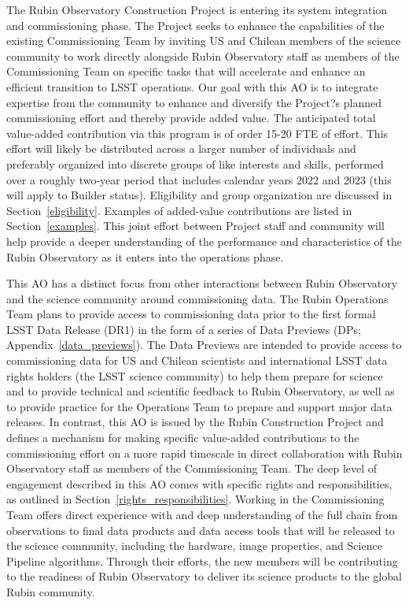 \documentclass[SE,authoryear,toc]{lsstdoc}
\begin{document}
The Rubin Observatory Construction Project is entering its system integration and commissioning phase. The Project seeks to enhance the capabilities of the existing Commissioning Team by inviting US and Chilean members of the science community to work directly alongside Rubin Observatory staff as members of the Commissioning Team on specific tasks that will accelerate and enhance an efficient transition to LSST operations. Our goal with this AO is to integrate expertise from the community to enhance and diversify the Project?s planned commissioning effort and thereby provide added value. The anticipated total value-added contribution via this program is of order 15-20 FTE of effort. This effort will likely be distributed across a larger number of individuals and preferably organized into discrete groups of like interests and skills, performed over a roughly two-year period that includes calendar years 2022 and 2023 (this will apply to Builder status). Eligibility and group organization are discussed in Section~\ref{eligibility}. Examples of added-value contributions are listed in Section~\ref{examples}. This joint effort between Project staff and community will help provide a deeper understanding of the performance and characteristics of the Rubin Observatory as it enters into the operations phase.

This AO has a distinct focus from other interactions between Rubin Observatory and the science community around commissioning data. The Rubin Operations Team plans to provide access to commissioning data prior to the first formal LSST Data Release (DR1) in the form of a series of Data Previews (DPs; Appendix~\ref{data_previews}). The Data Previews are intended to provide access to commissioning data for US and Chilean scientists and international LSST data rights holders (the LSST science community) to help them prepare for science and to provide technical and scientific feedback to Rubin Observatory, as well as to provide practice for the Operations Team to prepare and support major data releases. In contrast, this AO is issued by the Rubin Construction Project and defines a mechanism for making specific value-added contributions to the commissioning effort on a more rapid timescale in direct collaboration with Rubin Observatory staff as members of the Commissioning Team. The deep level of engagement described in this AO comes with specific rights and responsibilities, as outlined in Section~\ref{rights_responsibilities}. Working in the Commissioning Team offers direct experience with and deep understanding of the full chain from observations to final data products and data access tools that will be released to the science community, including the hardware, image properties, and Science Pipeline algorithms. Through their efforts, the new members will be contributing to the readiness of Rubin Observatory to deliver its science products to the global Rubin community. 
\end{document}
